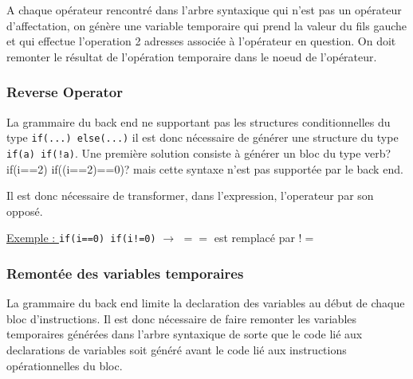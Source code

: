 A chaque opérateur rencontré dans l'arbre syntaxique qui n'est pas un opérateur d'affectation, on génère une variable temporaire qui prend la valeur du fils gauche et qui effectue l'operation 2 adresses associée à l'opérateur en question. On doit remonter le résultat de l'opération temporaire dans le noeud de l'opérateur.

\begin{center}
\end{center}

\subsubsection{Reverse Operator}

La grammaire du back end ne supportant pas les structures conditionnelles du type \verb?if(...) else(...)? il est donc nécessaire de générer une structure du type \verb?if(a) if(!a)?. Une première solution consiste à générer un bloc du type verb?if(i==2) if((i==2)==0)? mais cette syntaxe n'est pas supportée par le back end.

Il est donc nécessaire de transformer, dans l'expression, l'operateur par son opposé.

\underline{Exemple : } \verb?if(i==0) if(i!=0)? $\longrightarrow$ $==$ est remplacé par $!=$

\subsubsection{Remontée des variables temporaires}

La grammaire du back end limite la declaration des variables au début de chaque bloc d'instructions. Il est donc nécessaire de faire remonter les variables temporaires générées dans l'arbre syntaxique de sorte que le code lié aux declarations de variables soit généré avant le code lié aux instructions opérationnelles du bloc.




